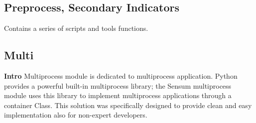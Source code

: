\documentclass[letterpaper,10pt,english]{sphinxmanual}
\begin{document}
\subsection{Preprocess, Secondary Indicators}
\label{lib:preprocess-secondary-indicators}
Contains a series of scripts and tools functions.


\subsection{Multi}
\label{lib:multi}
\textbf{Intro}
Multiprocess module is dedicated to multiprocess application. Python provides a powerful built-in multiprocess library; the Sensum multiprocess module uses this library to implement multiprocess applications through a container Class. This solution was specifically designed to provide clean and easy implementation also for non-expert developers.
\end{document}
